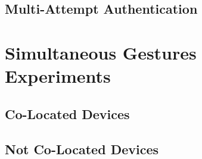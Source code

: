 \subsection{Multi-Attempt Authentication}

\section{Simultaneous Gestures Experiments}
\label{sec:GestureLibrary}

\subsection{Co-Located Devices}

\subsection{Not Co-Located Devices}


 


